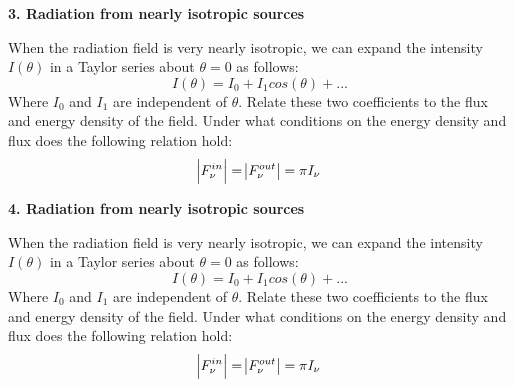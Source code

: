 \documentclass{article}
\begin{document}
	

	
	\textbf{3. Radiation from nearly isotropic sources}

		When the radiation field is very nearly isotropic, we can expand the intensity $I(\theta)$ in a Taylor series about $\theta =0$ as follows: 
		\begin{equation}
			I(\theta)= I_{0} + I_{1} cos(\theta) + ...
		\end{equation}
		Where $I_{0}$ and $I_{1}$ are independent of $\theta$. Relate these two coefficients to the flux and energy density of the field. Under what conditions on the energy density and flux does the following relation hold:
		\begin{equation}
			\abs{F^{in}_{\nu}} = \abs{F^{out}_{\nu}} = \pi I_{\nu}
		\end{equation}
	

	
	\textbf{4. Radiation from nearly isotropic sources}

		When the radiation field is very nearly isotropic, we can expand the intensity $I(\theta)$ in a Taylor series about $\theta =0$ as follows: 
		\begin{equation}
			I(\theta)= I_{0} + I_{1} cos(\theta) + ...
		\end{equation}
		Where $I_{0}$ and $I_{1}$ are independent of $\theta$. Relate these two coefficients to the flux and energy density of the field. Under what conditions on the energy density and flux does the following relation hold:
		\begin{equation}
			\abs{F^{in}_{\nu}} = \abs{F^{out}_{\nu}} = \pi I_{\nu}
		\end{equation}
	
\end{document}
